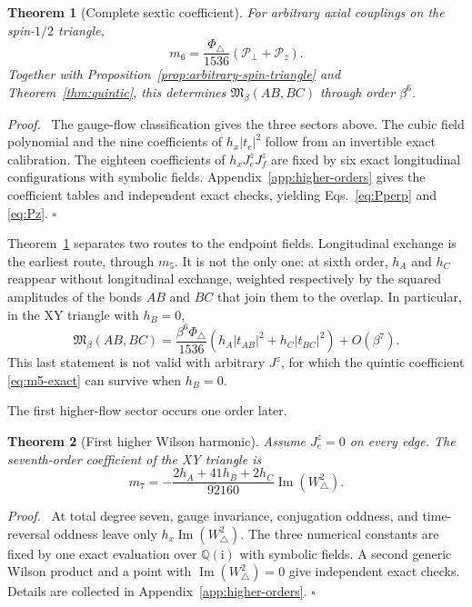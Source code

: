 \documentclass[11pt]{article}
\newcommand{\Mmod}{\mathfrak{M}}
\newcommand{\ii}{\mathrm{i}}
\newcommand{\PhiTri}{\Phi_\triangle}
\newtheorem{theorem}{Theorem}
\newenvironment{proof}{\par\noindent\textit{Proof.}\ }%
{\unskip\nobreak\hfill\(\square\)\par}
\begin{document}
\begin{theorem}[Complete sextic coefficient]
\label{thm:sextic}
For arbitrary axial couplings on the spin-$1/2$ triangle,
\begin{equation}
 m_6=\frac{\PhiTri}{1536}\left(\mathcal P_\perp+\mathcal P_z\right).
 \label{eq:m6-exact}
\end{equation}
Together with Proposition~\ref{prop:arbitrary-spin-triangle} and
Theorem~\ref{thm:quintic}, this
determines $\Mmod_\beta(AB,BC)$ through order $\beta^6$.
\end{theorem}

\begin{proof}
The gauge-flow classification gives the three sectors above.  The cubic
field polynomial and the nine coefficients of $h_x|t_e|^2$ follow from an
invertible exact calibration.  The eighteen coefficients of
$h_xJ_e^zJ_f^z$ are fixed by six exact longitudinal configurations with
symbolic fields.  Appendix~\ref{app:higher-orders} gives the coefficient
tables and independent exact checks, yielding Eqs.~\eqref{eq:Pperp} and
\eqref{eq:Pz}.
\end{proof}

Theorem~\ref{thm:sextic} separates two routes to the endpoint fields.
Longitudinal exchange is the earliest route, through $m_5$.  It is not the
only one: at sixth order, $h_A$ and $h_C$ reappear without longitudinal
exchange, weighted respectively by the squared amplitudes of the bonds $AB$
and $BC$ that join them to the overlap.  In particular, in the XY triangle
with $h_B=0$,
\begin{equation}
 \Mmod_\beta(AB,BC)
 =\frac{\beta^6\PhiTri}{1536}
 \left(h_A|t_{AB}|^2+h_C|t_{BC}|^2\right)+O(\beta^7).
 \label{eq:hB-zero-transverse}
\end{equation}
This last statement is not valid with arbitrary $J^z$, for which the quintic
coefficient \eqref{eq:m5-exact} can survive when $h_B=0$.

The first higher-flow sector occurs one order later.

\begin{theorem}[First higher Wilson harmonic]
\label{thm:septic}
Assume $J_e^z=0$ on every edge.  The seventh-order coefficient of the XY
triangle is
\begin{equation}
 m_7=-\frac{2h_A+41h_B+2h_C}{92160}
       \operatorname{Im}(W_\triangle^2).
 \label{eq:m7-exact}
\end{equation}
\end{theorem}

\begin{proof}
At total degree seven, gauge invariance, conjugation oddness, and time-reversal
oddness leave only $h_x\operatorname{Im}(W_\triangle^2)$.  The three numerical
constants are fixed by one exact evaluation over $\mathbb Q(\ii)$ with symbolic
fields.  A second generic Wilson product and a point with
$\operatorname{Im}(W_\triangle^2)=0$ give independent exact checks.  Details
are collected in Appendix~\ref{app:higher-orders}.
\end{proof}
\end{document}
